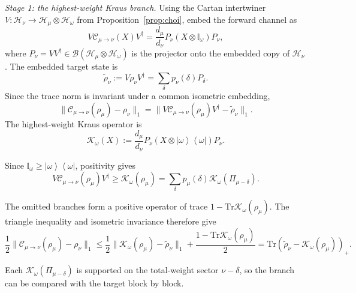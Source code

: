 \documentclass[a4paper,onecolumn,11pt]{quantumarticle}
\newcommand{\ketbra}[2]{\left|#1\right\rangle\!\!\left\langle #2\right|}
\def\h{\mathcal{H}}
\def\id{\mathbb{I}}
\newcommand*{\Tr}{\mathrm{Tr}}
\def\C{\mathcal{C}}
\begin{document}
\emph{Stage 1: the highest-weight Kraus branch.}
Using the Cartan intertwiner
$V:\mathcal H_\nu\to\mathcal H_\mu\otimes\mathcal H_\omega$ from
Proposition~\ref{prop:choi}, embed the forward channel as
\begin{equation}\label{eq:embedded_channel}
    V\C_{\mu\to\nu}(X)V^\dagger
    =
    \frac{d_\mu}{d_\nu}P_\nu(X\otimes \id_\omega)P_\nu ,
\end{equation}
where \(P_\nu=VV^\dagger\in\mathcal B(\h_\mu\otimes\h_\omega)\) is the projector onto the embedded copy of \(\mathcal H_\nu\).
The embedded target state is
\begin{equation}\label{eq:embedded_target}
    \widetilde{\rho}_\nu
    :=
    V\rho_\nu V^\dagger
    =
    \sum_\delta p_\nu(\delta)P_\delta .
\end{equation}
Since the trace norm is invariant under a common isometric embedding,
\begin{equation}\label{eq:isometric_invariance_forward}
    \|\C_{\mu\to\nu}(\rho_\mu)-\rho_\nu\|_1
    =\|V\C_{\mu\to\nu}(\rho_\mu)V^\dagger-\widetilde{\rho}_\nu\|_1.
\end{equation}
The highest-weight Kraus operator is
\begin{equation}\label{eq:kraus_proj}
\mathcal K_\omega(X)
    :=
    \frac{d_\mu}{d_\nu}P_\nu(X\otimes \ketbra{\omega}{\omega})P_\nu .
\end{equation}

Since $\id_\omega\ge\ketbra{\omega}{\omega}$, positivity gives
\begin{equation}\label{eq:forward_monotonicity}
    V\C_{\mu\to\nu}(\rho_\mu)V^\dagger
    \ge\mathcal K_\omega(\rho_\mu)
    =\sum_\delta p_\mu(\delta)
       \mathcal K_\omega(\Pi_{\mu-\delta}).
\end{equation}

The omitted branches form a positive operator of trace
$1-\Tr\mathcal K_\omega(\rho_\mu)$. The triangle inequality and
isometric invariance therefore give
\begin{equation}\label{eq:branch_trace_comparison}
\frac12\|\C_{\mu\to\nu}(\rho_\mu)-\rho_\nu\|_1
\le\frac12\|\mathcal K_\omega(\rho_\mu)-\widetilde\rho_\nu\|_1
+\frac{1-\Tr\mathcal K_\omega(\rho_\mu)}2=\Tr(\widetilde\rho_\nu-\mathcal K_\omega(\rho_\mu))_+.
\end{equation}


Each $\mathcal K_\omega(\Pi_{\mu-\delta})$ is supported on the total-weight
sector $\nu-\delta$, so the branch can be compared with the target
block by block.
\end{document}
